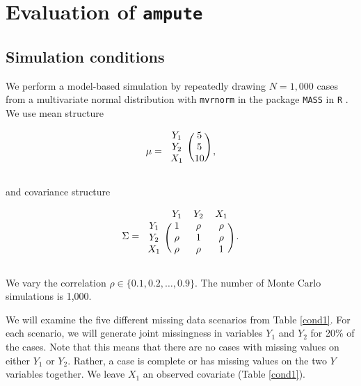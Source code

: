 \documentclass[11pt,a4paper]{article}
\newcommand{\code}[1]{\texttt{#1}}
\begin{document}
\section{Evaluation of \code{ampute}}\label{evaluation}

\subsection{Simulation conditions}

We perform a model-based simulation by repeatedly drawing $N = 1,000$ cases from a multivariate normal distribution with \code{mvrnorm} in the package \code{MASS} \citep{MASS} in \code{R} \citep{R}. We use mean structure

\begin{equation*}
\mu = 
\begin{blockarray}{cc}
\begin{block}{c(c)}
Y_1&5\\
Y_2&5\\
X_1&10\\
\end{block}
\end{blockarray}\hspace{1mm},
\end{equation*} 

\noindent and covariance structure  

\begin{equation*}
\Sigma = 
\begin{blockarray}{ccccc}
& Y_1 & Y_2 & X_1\\
\begin{block}{c(cccc)}
Y_1 & 1 & \rho & \rho \\
Y_2 & \rho & 1 & \rho \\
X_1 & \rho & \rho & 1 \\
\end{block}
\end{blockarray}\hspace{1mm}. 
\end{equation*}

\noindent We vary the correlation $\rho \in \{0.1, 0.2, \dots, 0.9\}$. The number of Monte Carlo simulations is 1,000.

We will examine the five different missing data scenarios from Table \ref{cond1}. For each scenario, we will generate joint missingness in variables $Y_1$ and $Y_2$ for 20\% of the cases. Note that this means that there are no cases with missing values on either $Y_1$ or $Y_2$. Rather, a case is complete or has missing values on the two $Y$ variables together. We leave $X_1$ an observed covariate (Table \ref{cond1}). 
\end{document}
